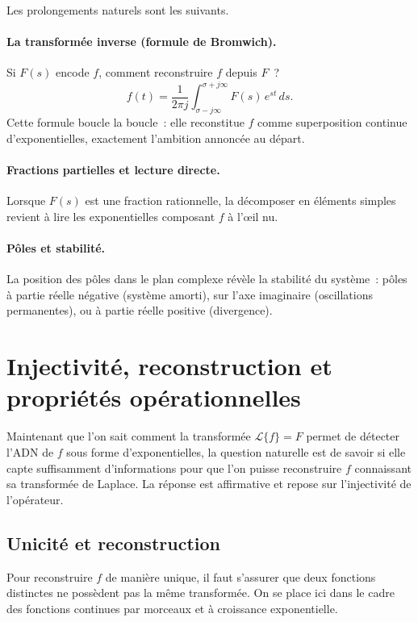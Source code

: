 \documentclass[11pt, a4paper]{article}
\theoremstyle{plain_style}
\begin{document}
Les prolongements naturels sont les suivants.

\paragraph{La transform\'{e}e inverse (formule de Bromwich).}
Si $F(s)$ encode $f$, comment reconstruire $f$ depuis $F$~?
\[
  f(t) = \frac{1}{2\pi j}
         \int_{\sigma - j\infty}^{\sigma + j\infty} F(s)\,e^{st}\,ds.
\]
Cette formule boucle la boucle~: elle reconstitue $f$ comme superposition continue
d'exponentielles, exactement l'ambition annonc\'{e}e au d\'{e}part.

\paragraph{Fractions partielles et lecture directe.}
Lorsque $F(s)$ est une fraction rationnelle, la d\'{e}composer en \'{e}l\'{e}ments simples
revient \`{a} lire les exponentielles composant $f$ \`{a} l'\oe{}il nu.

\paragraph{P\^{o}les et stabilit\'{e}.}
La position des p\^{o}les dans le plan complexe r\'{e}v\`{e}le la stabilit\'{e} du syst\`{e}me~:
p\^{o}les \`{a} partie r\'{e}elle n\'{e}gative (syst\`{e}me amorti), sur l'axe imaginaire
(oscillations permanentes), ou \`{a} partie r\'{e}elle positive (divergence).

\section{Injectivité, reconstruction et propriétés opérationnelles}

Maintenant que l'on sait comment la transformée $\mathcal{L}\{f\} = F$ permet de détecter l'ADN de $f$ sous forme d'exponentielles, la question naturelle est de savoir si elle capte suffisamment d'informations pour que l'on puisse reconstruire $f$ connaissant sa transformée de Laplace. La réponse est affirmative et repose sur l'injectivité de l'opérateur.

\subsection{Unicité et reconstruction}

Pour reconstruire $f$ de manière unique, il faut s'assurer que deux fonctions distinctes ne possèdent pas la même transformée. On se place ici dans le cadre des fonctions continues par morceaux et à croissance exponentielle.
\end{document}
